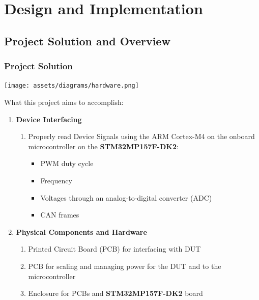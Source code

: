 \documentclass[8pt,compress,aspectratio=169]{beamer}
\newcommand\LightBold[1]{\textcolor{VSBlueLight}{\textbf{#1}}}
\newcommand\DarkBold[1]{\textcolor{VSBlueDark}{\textbf{#1}}}
\begin{document}
\section{Design and Implementation}
\subsection{Project Solution and Overview}

\begin{frame}
  \frametitle{Project Solution}
  \centering
  \texttt{[image: assets/diagrams/hardware.png]}
  \begin{block}{What this project aims to accomplish:}
    \begin{enumerate}
      \item {\DarkBold{Device Interfacing}}
        \begin{enumerate}
          \item Properly read Device Signals using the ARM Cortex-M4 on the onboard microcontroller on the 
            \LightBold{STM32MP157F-DK2}:
            \begin{itemize}
              \item PWM duty cycle
              \item Frequency
              \item Voltages through an analog-to-digital converter (ADC)
              \item CAN frames
            \end{itemize}
        \end{enumerate}
      \item \DarkBold{Physical Components and Hardware}
        \begin{enumerate}
          \item Printed Circuit Board (PCB) for interfacing with DUT
          \item PCB for scaling and managing power for the DUT and to the microcontroller
          \item Enclosure for PCBs and \LightBold{STM32MP157F-DK2} board
        \end{enumerate}
    \end{enumerate}
  \end{block}
\end{frame}
\end{document}
